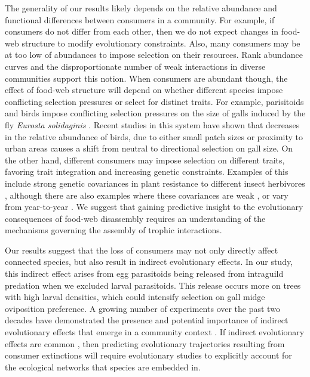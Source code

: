 \documentclass[11pt,]{article}
\begin{document}
The generality of our results likely depends on the relative abundance
and functional differences between consumers in a community. For
example, if consumers do not differ from each other, then we do not
expect changes in food-web structure to modify evolutionary constraints.
Also, many consumers may be at too low of abundances to impose selection
on their resources. Rank abundance curves \citep{Preston1948} and the
disproportionate number of weak interactions in diverse communities
\citep{Paine1992} support this notion. When consumers are abundant
though, the effect of food-web structure will depend on whether
different species impose conflicting selection pressures or select for
distinct traits. For example, parisitoids and birds impose conflicting
selection pressures on the size of galls induced by the fly
\emph{Eurosta solidaginis} \citep{Weis1985, Abrahamson1997}. Recent
studies in this system have shown that decreases in the relative
abundance of birds, due to either small patch sizes \citep{Start2016} or
proximity to urban areas \citep{Start2018} causes a shift from neutral
to directional selection on gall size. On the other hand, different
consumers may impose selection on different traits, favoring trait
integration and increasing genetic constraints. Examples of this include
strong genetic covariances in plant resistance to different insect
herbivores \citep{Maddox1990, Wise2007, Wise2013}, although there are
also examples where these covariances are weak
\citep{Roche1997, Barbour2015}, or vary from year-to-year
\citep{Johnson2007}. We suggest that gaining predictive insight to the
evolutionary consequences of food-web disassembly requires an
understanding of the mechanisms governing the assembly of trophic
interactions.

Our results suggest that the loss of consumers may not only directly
affect connected species, but also result in indirect evolutionary
effects. In our study, this indirect effect arises from egg parasitoids
being released from intraguild predation when we excluded larval
parasitoids. This release occurs more on trees with high larval
densities, which could intensify selection on gall midge oviposition
preference. A growing number of experiments over the past two decades
have demonstrated the presence and potential importance of indirect
evolutionary effects that emerge in a community context
\citep{Pilson1996, Juenger1998, Stinchcombe2001, Lankau2007, Walsh2008, Walsh2010, terHorst2010, Sahli2011, Lau2012, terHorst2015, Schiestl2018, Start2019}.
If indirect evolutionary effects are common \citep{Walsh2013}, then
predicting evolutionary trajectories resulting from consumer extinctions
will require evolutionary studies to explicitly account for the
ecological networks that species are embedded in.
\end{document}
